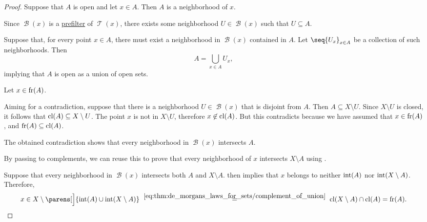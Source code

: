 \begin{proof}

  \SufficiencySubProof* Suppose that \( A \) is open and let \( x \in A \). Then \( A \) is a neighborhood of \( x \).

  Since \( \mscrB(x) \) is a \hyperref[def:prefilter]{prefilter} of \( \mscrT(x) \), there exists some neighborhood \( U \in \mscrB(x) \) such that \( U \subseteq A \).

  \NecessitySubProof* Suppose that, for every point \( x \in A \), there must exist a neighborhood in \( \mscrB(x) \) contained in \( A \). Let \( \seq{ U_x }_{x \in A} \) be a collection of such neighborhoods. Then
  \begin{equation*}
    A = \bigcup_{x \in A} U_x,
  \end{equation*}
  implying that \( A \) is open as a union of open sets.


  \SufficiencySubProof* Let \( x \in \operatorname{fr}(A) \).

  Aiming for a contradiction, suppose that there is a neighborhood \( U \in \mscrB(x) \) that is disjoint from \( A \). Then \( A \subseteq X \setminus U \). Since \( X \setminus U \) is closed, it follows that \( \operatorname{cl}(A) \subseteq X \setminus U \). The point \( x \) is not in \( X \setminus U \), therefore \( x \not\in \operatorname{cl}(A) \). But this contradicts  because we have assumed that \( x \in \operatorname{fr}(A) \), and \( \operatorname{fr}(A) \subseteq \operatorname{cl}(A) \).

  The obtained contradiction shows that every neighborhood in \( \mscrB(x) \) intersects \( A \).

  By passing to complements, we can reuse this to prove that every neighborhood of \( x \) intersects \( X \setminus A \) using .

  \NecessitySubProof* Suppose that every neighborhood in \( \mscrB(x) \) intersects both \( A \) and \( X \setminus A \).  then implies that \( x \) belongs to neither \( \operatorname{int}(A) \) nor \( \operatorname{int}(X \setminus A) \). Therefore,
  \begin{equation*}
    x
    \in
    X \setminus \parens[\Big]{ \Int(A) \cup \Int(X \setminus A) }
    \reloset {\eqref{eq:thm:de_morgans_laws_for_sets/complement_of_union}} =
    \cl(X \setminus A) \cap \cl(A)
    =
    \fr(A).
  \end{equation*}


\end{proof}
